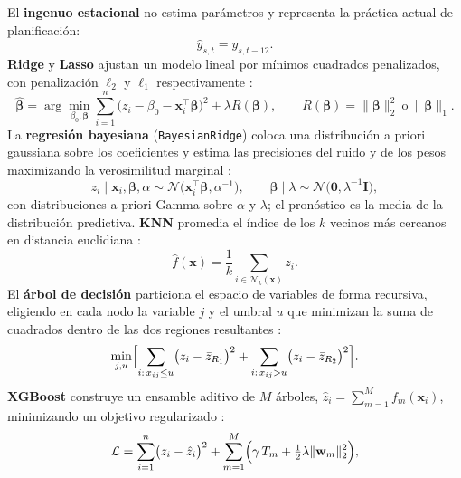 \documentclass[pdflatex,sn-mathphys-num]{sn-jnl}
\begin{document}
El \textbf{ingenuo estacional} \cite{hyndman2021} no estima parámetros y representa la práctica actual de planificación:
\begin{equation}
\hat{y}_{s,t}=y_{s,t-12}.
\label{eq:naive}
\end{equation}
\textbf{Ridge} y \textbf{Lasso} ajustan un modelo lineal por mínimos cuadrados penalizados, con penalización $\ell_2$ y $\ell_1$ respectivamente \cite{hoerl1970,tibshirani1996}:
\begin{equation}
\hat{\boldsymbol{\beta}}=\arg\min_{\beta_0,\boldsymbol{\beta}}\sum_{i=1}^{n}\bigl(z_i-\beta_0-\mathbf{x}_i^{\top}\boldsymbol{\beta}\bigr)^2+\lambda R(\boldsymbol{\beta}),\qquad R(\boldsymbol{\beta})=\lVert\boldsymbol{\beta}\rVert_2^2\ \text{o}\ \lVert\boldsymbol{\beta}\rVert_1.
\label{eq:ridge}
\end{equation}
La \textbf{regresión bayesiana} (\texttt{BayesianRidge}) coloca una distribución a priori gaussiana sobre los coeficientes y estima las precisiones del ruido y de los pesos maximizando la verosimilitud marginal \cite{mackay1992}:
\begin{equation}
z_i\mid\mathbf{x}_i,\boldsymbol{\beta},\alpha\sim\mathcal{N}\bigl(\mathbf{x}_i^{\top}\boldsymbol{\beta},\alpha^{-1}\bigr),\qquad \boldsymbol{\beta}\mid\lambda\sim\mathcal{N}\bigl(\mathbf{0},\lambda^{-1}\mathbf{I}\bigr),
\label{eq:bayes}
\end{equation}
con distribuciones a priori Gamma sobre $\alpha$ y $\lambda$; el pronóstico es la media de la distribución predictiva. \textbf{KNN} promedia el índice de los $k$ vecinos más cercanos en distancia euclidiana \cite{cover1967}:
\begin{equation}
\hat{f}(\mathbf{x})=\frac{1}{k}\sum_{i\in\mathcal{N}_k(\mathbf{x})}z_i.
\label{eq:knn}
\end{equation}
El \textbf{árbol de decisión} particiona el espacio de variables de forma recursiva, eligiendo en cada nodo la variable $j$ y el umbral $u$ que minimizan la suma de cuadrados dentro de las dos regiones resultantes \cite{breiman1984}:
\begin{equation}
\min_{j,u}\Bigl[\sum_{i:\,x_{ij}\le u}\bigl(z_i-\bar{z}_{R_1}\bigr)^2+\sum_{i:\,x_{ij}>u}\bigl(z_i-\bar{z}_{R_2}\bigr)^2\Bigr].
\label{eq:arbol}
\end{equation}
\textbf{XGBoost} construye un ensamble aditivo de $M$ árboles, $\hat{z}_i=\sum_{m=1}^{M}f_m(\mathbf{x}_i)$, minimizando un objetivo regularizado \cite{chen2016}:
\begin{equation}
\mathcal{L}=\sum_{i=1}^{n}\bigl(z_i-\hat{z}_i\bigr)^2+\sum_{m=1}^{M}\Bigl(\gamma\,T_m+\tfrac{1}{2}\lambda\lVert\mathbf{w}_m\rVert_2^2\Bigr),
\label{eq:xgb}
\end{equation}
\end{document}
